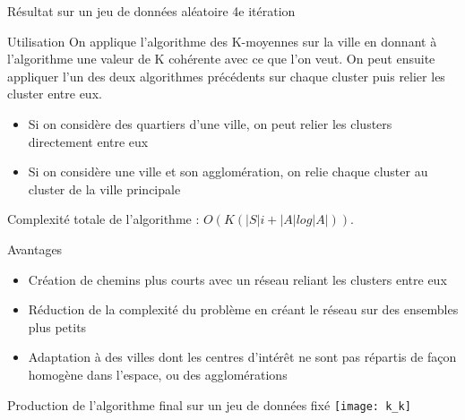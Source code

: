 \documentclass[aspectratio=43,11pt]{beamer}
\begin{document}
\begin{frame}{Résultat sur un jeu de données aléatoire}
{        4e itération
    }
\end{frame}
\begin{frame}{Utilisation}
    On applique l'algorithme des K-moyennes sur la ville en donnant à l'algorithme une valeur de K cohérente avec ce que l'on veut.
    On peut ensuite appliquer l'un des deux algorithmes précédents sur chaque cluster puis relier les cluster entre eux.
    \begin{itemize}
        \item Si on considère des quartiers d'une ville, on peut relier les clusters directement entre eux
        \item Si on considère une ville et son agglomération, on relie chaque cluster au cluster de la ville principale
    \end{itemize}
    Complexité totale de l'algorithme : $O(K (|S| i + |A| log |A|))$.
\end{frame}
\begin{frame}{Avantages}
    \begin{itemize}
        \item Création de chemins plus courts avec un réseau reliant les clusters entre eux
        \item Réduction de la complexité du problème en créant le réseau sur des ensembles plus petits
        \item Adaptation à des villes dont les centres d'intérêt ne sont pas répartis de façon homogène dans l'espace, ou des agglomérations
    \end{itemize}
\end{frame}
\begin{frame}{Production de l'algorithme final sur un jeu de données fixé}
    \centering
        \texttt{[image: k\_k]}
\end{frame}
\end{document}
